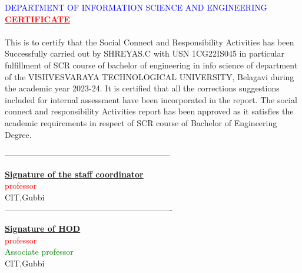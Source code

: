 \documentclass[a4paper,15pt]{article}
\begin{document}
\textcolor{blue}{DEPARTMENT OF INFORMATION SCIENCE AND ENGINEERING}\\
\vspace{5mm}
\centering
\vspace{5mm}
\textcolor{red}{\underline{\textbf{CERTIFICATE}}}\\
\paragraph{}
This is to certify that the Social Connect and Responsibility Activities has been Successfully carried out by SHREYAS.C with USN 1CG22IS045 in particular fulfillment of SCR course of bachelor of engineering in info science of department of the VISHVESVARAYA TECHNOLOGICAL UNIVERSITY, Belagavi during the academic year 2023-24.
It is certified that all the corrections suggestions included for internal assessment have been incorporated in the report. The social connect and responsibility Activities report has been approved as it satisfies the academic requirements in respect of SCR course of Bachelor of Engineering Degree.
\begin{center}
    \centering
------------------------------------------------------------

    \vspace{5mm}
    \underline{\textbf{Signature of the staff coordinator}}\\
    \vspace{5mm}
    \textcolor{red}{professor}\\
    CIT,Gubbi\\
    \vspace{10mm}
    \centering
-------------------------------------------------------------

    \underline{\textbf{Signature of HOD}}\\
    \vspace{3mm}
    \textcolor{red}{professor}\\
    \textcolor{green}{Associate professor}\\
    CIT,Gubbi\\
\end{center}
\end{document}
